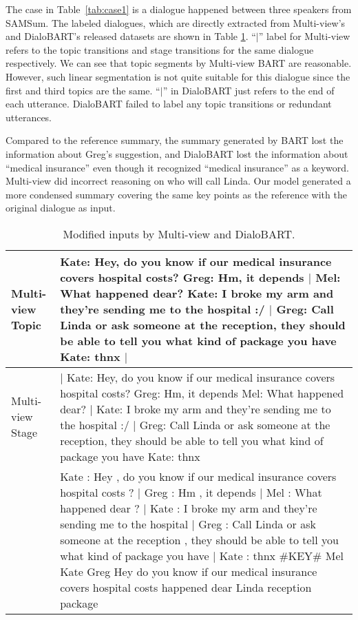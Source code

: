 The case in Table~\ref{tab:case1} is a dialogue happened between three speakers from SAMSum. 
The labeled dialogues, which are directly extracted from Multi-view's and DialoBART's released datasets are shown in Table \ref{tab:case1inputs}. ``$\mid$'' label for Multi-view refers to the topic transitions and stage transitions for the same dialogue respectively. 
We can see that topic segments by Multi-view BART are reasonable. However, such linear segmentation is not quite suitable for this dialogue since the first and third topics are the same.
``$\mid$'' in DialoBART just refers to the end of each utterance.
DialoBART failed to label any topic transitions or redundant utterances.

Compared to the reference summary, the summary generated by BART lost the information about Greg's suggestion, and DialoBART lost the information about ``medical insurance'' even though it recognized ``medical insurance'' as a keyword.
Multi-view did incorrect reasoning on who will call Linda.
Our model generated a more condensed summary covering the same key points as the reference with the original dialogue as input.

\begin{table}
	\small
	\centering
	\begin{tabular}{lp{5cm}}
		\toprule[1pt]
		\makecell[l]{{Multi-view}\\ {Topic}}& Kate: Hey, do you know if our medical insurance covers hospital costs? Greg: Hm, it depends $\mid$ Mel: What happened dear? Kate: I broke my arm and they're sending me to the hospital :/ $\mid$ Greg: Call Linda or ask someone at the reception, they should be able to tell you what kind of package you have Kate: thnx $\mid$
		\\
		
		\hline
		\makecell[l]{{Multi-view}\\ {Stage}} & $\mid$ Kate: Hey, do you know if our medical insurance covers hospital costs? Greg: Hm, it depends Mel: What happened dear? $\mid$ Kate: I broke my arm and they're sending me to the hospital :/ $\mid$ Greg: Call Linda or ask someone at the reception, they should be able to tell you what kind of package you have Kate: thnx
		\\
		
		\hline
		\makecell[l]{{DialoBART}} & Kate : Hey , do you know if our medical insurance covers hospital costs ? $\mid$ Greg : Hm , it depends $\mid$ Mel : What happened dear ? $\mid$ Kate : I broke my arm and they're sending me to the hospital $\mid$ Greg : Call Linda or ask someone at the reception , they should be able to tell you what kind of package you have $\mid$ Kate : thnx \#KEY\# Mel Kate Greg Hey do you know if our medical insurance covers hospital costs happened dear Linda reception package\\
		
		\bottomrule[1pt]
	\end{tabular}
	\caption{Modified inputs by Multi-view and DialoBART.}
	\label{tab:case1inputs}
\end{table}

